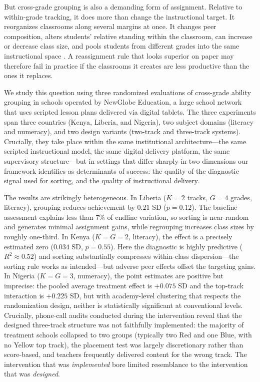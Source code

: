 \documentclass[11pt]{article}
\begin{document}
But cross-grade grouping is also a demanding form of assignment. Relative to within-grade tracking, it does more than change the instructional target. It reorganizes classrooms along several margins at once. It changes peer composition, alters students' relative standing within the classroom, can increase or decrease class size, and pools students from different grades into the same instructional space \citep{betts:2011}. A reassignment rule that looks superior on paper may therefore fail in practice if the classrooms it creates are less productive than the ones it replaces.

We study this question using three randomized evaluations of cross-grade ability grouping in schools operated by NewGlobe Education, a large school network that uses scripted lesson plans delivered via digital tablets. The three experiments span three countries (Kenya, Liberia, and Nigeria), two subject domains (literacy and numeracy), and two design variants (two-track and three-track systems). Crucially, they take place within the same institutional architecture---the same scripted instructional model, the same digital delivery platform, the same supervisory structure---but in settings that differ sharply in two dimensions our framework identifies as determinants of success: the quality of the diagnostic signal used for sorting, and the quality of instructional delivery.

The results are strikingly heterogeneous. In Liberia ($K = 2$ tracks, $G = 4$ grades, literacy), grouping reduces achievement by $0.21$ SD ($p = 0.12$). The baseline assessment explains less than 7\% of endline variation, so sorting is near-random and generates minimal assignment gains, while regrouping increases class sizes by roughly one-third. In Kenya ($K = G = 2$, literacy), the effect is a precisely estimated zero ($0.034$ SD, $p = 0.55$). Here the diagnostic is highly predictive ($R^2 \approx 0.52$) and sorting substantially compresses within-class dispersion---the sorting rule works as intended---but adverse peer effects offset the targeting gains. In Nigeria ($K = G = 3$, numeracy), the point estimates are positive but imprecise: the pooled average treatment effect is $+0.075$ SD and the top-track interaction is $+0.225$ SD, but with academy-level clustering that respects the randomization design, neither is statistically significant at conventional levels. Crucially, phone-call audits conducted during the intervention reveal that the designed three-track structure was not faithfully implemented: the majority of treatment schools collapsed to two groups (typically two Red and one Blue, with no Yellow top track), the placement test was largely discretionary rather than score-based, and teachers frequently delivered content for the wrong track. The intervention that was \emph{implemented} bore limited resemblance to the intervention that was \emph{designed}.
\end{document}
